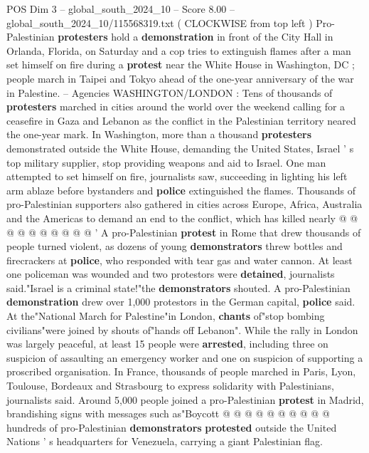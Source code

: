 \begin{textsample}{POS Dim 3 – global\_south\_2024\_10 – Score 8.00 – global\_south\_2024\_10/115568319.txt}  \label{ex:f3_pos_404}
( CLOCKWISE from top left ) Pro-Palestinian \textbf{protesters} hold a \textbf{demonstration} in front of the City Hall in Orlanda, Florida, on Saturday and a cop tries to extinguish flames after a man set himself on fire during a \textbf{protest} near the White House in Washington, DC ; people march in Taipei and Tokyo ahead of the one-year anniversary of the war in Palestine. -- Agencies WASHINGTON/LONDON : Tens of thousands of \textbf{protesters} marched in cities around the world over the weekend calling for a ceasefire in Gaza and Lebanon as the conflict in the Palestinian territory neared the one-year mark.
In Washington, more than a thousand \textbf{protesters} demonstrated outside the White House, demanding the United States, Israel ' s top military supplier, stop providing weapons and aid to Israel.
One man attempted to set himself on fire, journalists saw, succeeding in lighting his left arm ablaze before bystanders and \textbf{police} extinguished the flames.
Thousands of pro-Palestinian supporters also gathered in cities across Europe, Africa, Australia and the Americas to demand an end to the conflict, which has killed nearly @ @ @ @ @ @ @ @ @ @ ' A pro-Palestinian \textbf{protest} in Rome that drew thousands of people turned violent, as dozens of young \textbf{demonstrators} threw bottles and firecrackers at \textbf{police}, who responded with tear gas and water cannon.
At least one policeman was wounded and two protestors were \textbf{detained}, journalists said."Israel is a criminal state!"the \textbf{demonstrators} shouted.
A pro-Palestinian \textbf{demonstration} drew over 1,000 protestors in the German capital, \textbf{police} said.
At the"National March for Palestine"in London, \textbf{chants} of"stop bombing civilians"were joined by shouts of"hands off Lebanon".
While the rally in London was largely peaceful, at least 15 people were \textbf{arrested}, including three on suspicion of assaulting an emergency worker and one on suspicion of supporting a proscribed organisation.
In France, thousands of people marched in Paris, Lyon, Toulouse, Bordeaux and Strasbourg to express solidarity with Palestinians, journalists said.
Around 5,000 people joined a pro-Palestinian \textbf{protest} in Madrid, brandishing signs with messages such as"Boycott @ @ @ @ @ @ @ @ @ @ hundreds of pro-Palestinian \textbf{demonstrators} \textbf{protested} outside the United Nations ' s headquarters for Venezuela, carrying a giant Palestinian flag.

\end{textsample}
